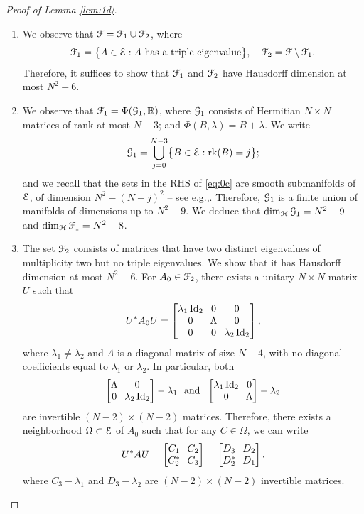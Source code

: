 \documentclass[11pt]{article}
\newcommand{\eg}{e.g.,\xspace}
\newcommand{\skpt}{\smallskip}
\numberwithin{equation}{section}
\let\pazocal\EuScript
\let\sep:
\theoremstyle{definition}
\DeclareMathOperator{\Id}{Id}
\DeclareMathOperator{\rk}{rk}
\newcommand{\FF}{\pazocal{F}}
\newcommand{\GG}{\pazocal{G}}
\newcommand{\EE}{\pazocal{E}}
\newcommand{\HH}{\pazocal{H}}
\newcommand{\R}{\mathbb{R}}
\newcommand{\matrice}[1]{\arraycolsep3.5pt\begin{bmatrix}#1\end{bmatrix}}
\begin{document}
\skpt
\begin{proof}[Proof of Lemma \ref{lem:1d}]
\begin{enumerate}
\item
We observe that $\FF= \FF_1 \cup \FF_2$, where
\begin{equation*}
\FF_1 = \bigl\{A \in \EE \sep \text{$A$ has a triple eigenvalue} \bigr\}, \quad
\FF_2 = \FF \setminus \FF_1.
\end{equation*}
Therefore, it suffices to show that $\FF_1$ and $\FF_2$ have Hausdorff dimension at most $N^2-6$.

\item
We observe that $\FF_1 = \Phi(\GG_1,\R)$, where $\GG_1$ consists of Hermitian $N \times N$ matrices of rank at most $N-3$; and $\Phi(B,\lambda) = B+\lambda$. We write
\begin{equation}\label{eq:0c}
\GG_1 = \bigcup_{j=0}^{N-3} \bigl\{ B \in \EE \sep \rk(B) = j\bigr\};
\end{equation}
and we recall that the sets in the RHS of \eqref{eq:0c} are smooth submanifolds of $\EE$, of dimension $N^2-(N-j)^2$ -- see \eg \cite[\S1.4]{GP74}. Therefore, $\GG_1$ is a finite union of manifolds of dimensions up to $N^2-9$. We deduce that $\dim_{\HH}\GG_1 = N^2-9$ and $\dim_\HH \FF_1 = N^2-8$.

\item
The set $\FF_2$ consists of matrices that have two distinct eigenvalues of multiplicity two but no triple eigenvalues.
We show that it has Hausdorff dimension at most $N^2-6$. For $A_0 \in \FF_2$, there exists a unitary $N \times N$ matrix $U$ such that
\begin{equation*}
U^* A_0 U= \matrice{\lambda_1 \Id_2 & 0 & 0 \\ 0 & \Lambda & 0 \\ 0 & 0 & \lambda_2 \Id_2},
\end{equation*}
where $\lambda_1 \neq \lambda_2$ and $\Lambda$ is a diagonal matrix of size $N-4$, with no diagonal coefficients equal to $\lambda_1$ or $\lambda_2$. In particular, both
\begin{equation*}
\matrice{\Lambda & 0 \\ 0 & \lambda_2 \Id_2} - \lambda_1 \ \ \text{and} \ \ \matrice{\lambda_1 \Id_2 & 0 \\ 0 & \Lambda } - \lambda_2
\end{equation*}
are invertible $(N-2) \times (N-2)$ matrices. Therefore, there exists a neighborhood $\Omega \subset \EE$ of $A_0$ such that for any $C \in \Omega$, we can write
\begin{equation*}
U^* A U = \matrice{C_1 & C_2 \\ C_2^* & C_3} = \matrice{D_3 & D_2 \\ D_2^* & D_1} ,
\end{equation*}
where $C_3 - \lambda_1$ and $D_3-\lambda_2$ are $(N-2) \times (N-2)$ invertible matrices.


\end{enumerate}
\end{proof}
\end{document}

